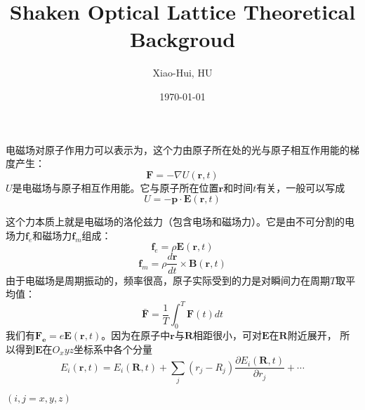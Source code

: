 \documentclass{article}
\title{Shaken Optical Lattice Theoretical Backgroud}
\author{Xiao-Hui, HU}
\date{\today}
\begin{document}
	\maketitle
	电磁场对原子作用力可以表示为，这个力由原子所在处的光与原子相互作用能的梯度产生：
	\begin{equation}
		\boldsymbol{F} = -\nabla U(\boldsymbol{r},t) \label{eq:1}
	\end{equation}
	$U$是电磁场与原子相互作用能。它与原子所在位置$\boldsymbol{r}$和时间$t$有关，一般可以写成
	\begin{equation}
		U = - \boldsymbol{p} \cdot \boldsymbol{E}(\boldsymbol{r},t) \label{eq:2}
	\end{equation}

	这个力本质上就是电磁场的洛伦兹力（包含电场和磁场力）。它是由不可分割的电场力$\boldsymbol{f}_e$和磁场力$\boldsymbol{f}_m$组成：
	\begin{equation}
		\boldsymbol{f}_e = \rho \boldsymbol{E}(\boldsymbol{r},t) \label{eq:3}
	\end{equation}
	\begin{equation}
		\boldsymbol{f}_m = \rho \frac{d\boldsymbol{r}}{dt} \times \boldsymbol{B}(\boldsymbol{r},t) \label{eq:4}
	\end{equation}
	由于电磁场是周期振动的，频率很高，原子实际受到的力是对瞬间力在周期$T$取平均值：
	\begin{equation}
		\bar{\boldsymbol{F}} = \frac{1}{T} \int_{0}^{T} \boldsymbol{F}(t)dt \label{eq:5}
	\end{equation}
	我们有$\boldsymbol{F_e} = e \boldsymbol{E}(\boldsymbol{r},t)$。因为在原子中$\boldsymbol{r}$与$\boldsymbol{R}$相距很小，可对$\boldsymbol{E}$在$\boldsymbol{R}$附近展开，
	所以得到$\boldsymbol{E}$在$O_xyz$坐标系中各个分量
	\begin{equation}
		E_i(\boldsymbol{r},t) = E_i(\boldsymbol{R},t) + \sum_j (r_j - R_j) \frac{\partial E_i(\boldsymbol{R},t)}{\partial r_j} + \cdots  \label{eq:6}
	\end{equation}
	\centerline{$(i,j = x,y,z)$}
\end{document}
